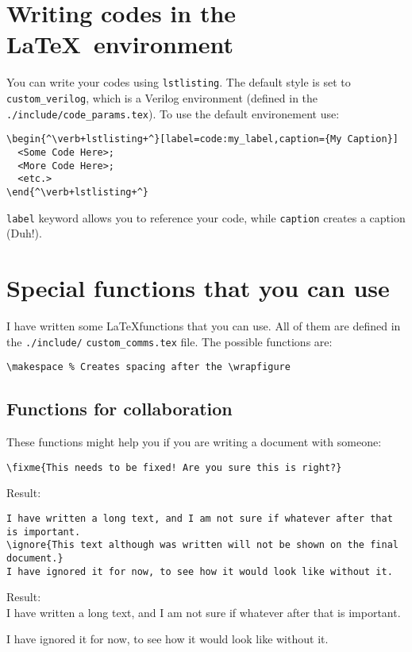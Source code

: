         \pagebreak
        \section {Writing codes in the \LaTeX~environment}
        You can write your codes using \verb+lstlisting+. The default style is set to 
        \verb+custom_verilog+, which is a Verilog environment (defined in the 
        \verb+./include/code_params.tex+). To use the default environement use:

        \begin{lstlisting}[language={[LaTeX]{TeX}},numbers=none]
\begin{^\verb+lstlisting+^}[label=code:my_label,caption={My Caption}]
  <Some Code Here>;
  <More Code Here>;
  <etc.>
\end{^\verb+lstlisting+^}
        \end{lstlisting}
        \verb+label+ keyword allows you to reference your code, while \verb+caption+ creates a
        caption (Duh!).

        \section {Special functions that you can use}
        \label{sec:functions}
        I have written some \LaTeX functions that you can use. All of them are defined in the
        \verb+./include/+ \verb+custom_comms.tex+ file. The possible functions are:
        \begin{lstlisting}[language={[LaTeX]{TeX}},numbers=none]
\makespace % Creates spacing after the \wrapfigure
        \end{lstlisting}
        
        \subsection {Functions for collaboration}
        \label{sec:functions:collaboration}
        These functions might help you if you are writing a document with someone:
        \begin{lstlisting}[language={[LaTeX]{TeX}},numbers=none]
\fixme{This needs to be fixed! Are you sure this is right?}
        \end{lstlisting}
        Result: \\

        \begin{lstlisting}[language={[LaTeX]{TeX}},numbers=none]
I have written a long text, and I am not sure if whatever after that is important.
\ignore{This text although was written will not be shown on the final document.}
I have ignored it for now, to see how it would look like without it.
        \end{lstlisting}
        Result: \\
        I have written a long text, and I am not sure if whatever after that is important.
        I have ignored it for now, to see how it would look like without it.

